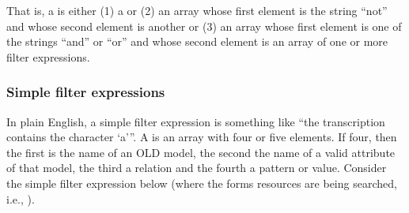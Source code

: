 \documentclass[letterpaper,10pt,english]{sphinxmanual}
\begin{document}
\begin{productionlist}
\label{interface:grammar-token-filterExpression}
\label{interface:grammar-token-simpleFilterExpression}
\label{interface:grammar-token-complexFilterExpression}
\productioncont{ ``{[}'', ``and'' '','' ``{[}'' {\hyperref[interface:grammar-token-filterExpression]{\code{filterExpression}}} ('','' {\hyperref[interface:grammar-token-filterExpression]{\code{filterExpression}}})* ``{]}'' \textbar{}}
\productioncont{ ``{[}'', ``or'' '','' ``{[}'' {\hyperref[interface:grammar-token-filterExpression]{\code{filterExpression}}} ('','' {\hyperref[interface:grammar-token-filterExpression]{\code{filterExpression}}})* ``{]}''}
\end{productionlist}


That is, a  is either (1) a  or
(2) an array whose first element is the string ``not'' and whose second element is
another  or (3) an array whose first element is one of the
strings ``and'' or ``or'' and whose second element is an array of one or more
filter expressions.


\subsubsection{Simple filter expressions}
\label{interface:simple-filter-expressions}
In plain English, a simple filter expression is something like ``the
transcription contains the character `a'''.  A  is an
array with four or five elements.  If four, then the first is the name of an OLD
model, the second the name of a valid attribute of that model, the third a
relation and the fourth a pattern or value.  Consider the simple filter
expression below (where the forms resources are being searched, i.e.,
).
\end{document}
